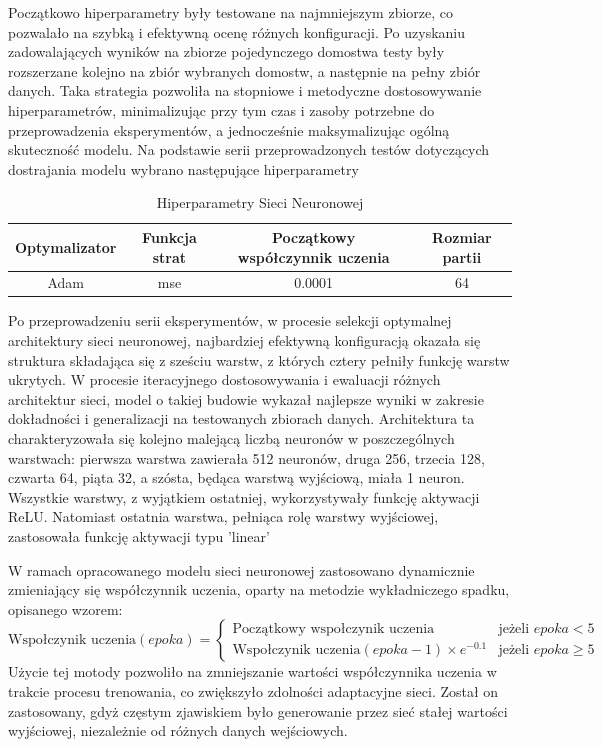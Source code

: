 \documentclass[a4paper,twoside,12pt]{book}
\begin{document}
Początkowo hiperparametry były testowane na najmniejszym zbiorze, co pozwalało na szybką i efektywną ocenę różnych konfiguracji. Po uzyskaniu zadowalających wyników na zbiorze pojedynczego domostwa testy były rozszerzane kolejno na zbiór wybranych domostw, a następnie na pełny zbiór danych. Taka strategia pozwoliła na stopniowe i metodyczne dostosowywanie hiperparametrów, minimalizując przy tym czas i zasoby potrzebne do przeprowadzenia eksperymentów, a jednocześnie maksymalizując ogólną skuteczność modelu. Na podstawie serii przeprowadzonych testów dotyczących dostrajania modelu wybrano następujące hiperparametry
\begin{table}[!h]
	\centering
	\caption{Hiperparametry Sieci Neuronowej}
	\begin{tabular}{|c|c|c|c|}
		\hline
		Optymalizator & Funkcja strat & Początkowy współczynnik uczenia & Rozmiar partii \\ \hline
		Adam          & mse           & 0.0001                          & 64             \\ \hline
	\end{tabular}
\end{table}

Po przeprowadzeniu serii eksperymentów, w procesie selekcji optymalnej architektury sieci neuronowej, najbardziej efektywną konfiguracją okazała się struktura składająca się z sześciu warstw, z których cztery pełniły funkcję warstw ukrytych. W procesie iteracyjnego dostosowywania i ewaluacji różnych architektur sieci, model o takiej budowie wykazał najlepsze wyniki w zakresie dokładności i generalizacji na testowanych zbiorach danych. Architektura ta charakteryzowała się kolejno malejącą liczbą neuronów w poszczególnych warstwach: pierwsza warstwa zawierała 512 neuronów, druga 256, trzecia 128, czwarta 64, piąta 32, a szósta, będąca warstwą wyjściową, miała 1 neuron. Wszystkie warstwy, z wyjątkiem ostatniej, wykorzystywały funkcję aktywacji ReLU. Natomiast ostatnia warstwa, pełniąca rolę warstwy wyjściowej, zastosowała funkcję aktywacji typu 'linear'


W ramach opracowanego modelu sieci neuronowej zastosowano dynamicznie zmieniający się współczynnik uczenia, oparty na metodzie wykładniczego spadku, opisanego wzorem:
\begin{equation}
	\text{Wspołczynik uczenia}(epoka) =
	\begin{cases}
		\text{Początkowy wspołczynik uczenia}                 & \text{jeżeli } epoka < 5    \\
		\text{Wspołczynik uczenia}(epoka - 1) \times e^{-0.1} & \text{jeżeli } epoka \geq 5
	\end{cases}
\end{equation}
Użycie tej motody pozwoliło na zmniejszanie wartości współczynnika uczenia w trakcie procesu trenowania, co zwiększyło zdolności adaptacyjne sieci. Został on zastosowany, gdyż częstym zjawiskiem było generowanie przez sieć stałej wartości wyjściowej, niezależnie od różnych danych wejściowych.
\end{document}
